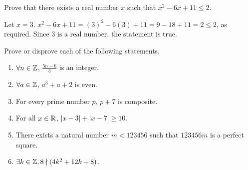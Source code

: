 \begin{recommended}
  Prove that there exists a real number $x$ such that $x^2 - 6x + 11 \leq 2$.
\end{recommended}
\begin{prf}
  Let $x=3$.
  $x^2-6x+11=(3)^2-6(3)+11=9-18+11=2 \leq 2$, as required.
  Since 3 is a real number, the statement is true.
\end{prf}


\begin{recommended}
  Prove or disprove each of the following statements.
  \begin{enumerate}
    \item $\forall n\in\mathbb{Z}$, $\frac{5n-6}{3}$ is an integer.
    \item $\forall a\in\mathbb{Z}$, $a^3+a+2$ is even.
    \item For every prime number $p$, $p + 7$ is composite.
    \item For all $x \in \mathbb{R}$, $|x-3| + |x-7| \geq 10$.
    \item There exists a natural number $m < 123456$ such that $123456m$ is a perfect square.
    \item $\exists k\in\mathbb{Z}, 8\nmid(4k^2+12k+8)$.
  \end{enumerate}
\end{recommended}
